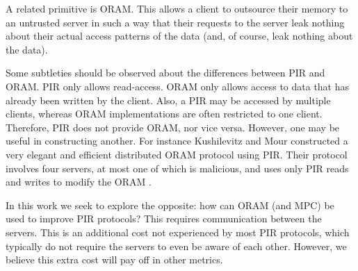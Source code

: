 A related primitive is ORAM. This allows a client to outsource
their memory to an untrusted server in such a way that their
requests to the server leak nothing about their actual
access patterns of the data (and, of course, leak nothing about
the data). 

Some subtleties should be observed about the differences
between PIR and ORAM.
PIR only allows read-access.
ORAM only allows access to data that has already been written
by the client. 
Also, a PIR may be accessed by multiple clients,
whereas ORAM implementations are often restricted to one client.
Therefore, PIR does not provide ORAM, nor vice versa. 
However, one may be useful in constructing another.
For instance Kushilevitz and Mour constructed a very elegant
and efficient distributed ORAM protocol using PIR.
Their protocol involves four servers, at most one of which is 
malicious, and uses only PIR reads and writes to modify the ORAM
\cite{kushilevitz2018sub}.

In this work we seek to explore the opposite: 
how can ORAM (and MPC) be used to improve PIR protocols?
This requires communication between the servers.
This is an additional cost not experienced by most
PIR protocols, which typically do not require the servers
to even be aware of each other.
However, we believe this extra cost will pay off in other metrics.

